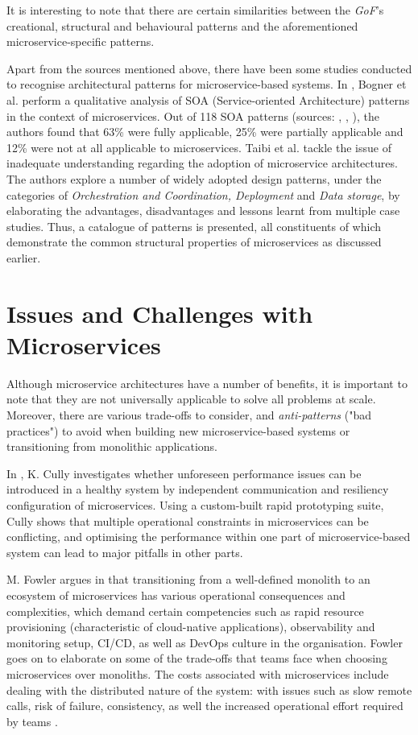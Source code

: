 It is interesting to note that there are certain similarities between the \textit{GoF}'s creational, structural and behavioural patterns \cite{gof94} and the aforementioned microservice-specific patterns. \linebreak

Apart from the sources mentioned above, there have been some studies conducted to recognise architectural patterns for microservice-based systems. In \cite{bogner18}, Bogner et al. perform a qualitative analysis of SOA (Service-oriented Architecture) patterns in the context of microservices. Out of 118 SOA patterns (sources: \cite{erl09}, \cite{erl12}, \cite{rotem12}), the authors found that 63\% were fully applicable, 25\% were partially applicable and 12\% were not at all applicable to microservices. Taibi et al. \cite{taibi18} tackle the issue of inadequate understanding regarding the adoption of microservice architectures. The authors explore a number of widely adopted design patterns, under the categories of \textit{Orchestration and Coordination, Deployment} and \textit{Data storage}, by elaborating the advantages, disadvantages and lessons learnt from multiple case studies. Thus, a catalogue of patterns is presented, all constituents of which demonstrate the common structural properties of microservices as discussed earlier.

\section{Issues and Challenges with Microservices}

Although microservice architectures have a number of benefits, it is important to note that they are not universally applicable to solve all problems at scale. Moreover, there are various trade-offs to consider, and \textit{anti-patterns} ("bad practices") to avoid when building new microservice-based systems or transitioning from monolithic applications.

In \cite{cully20}, K. Cully investigates whether unforeseen performance issues can be introduced in a healthy system by independent communication and resiliency configuration of microservices. Using a custom-built rapid prototyping suite, Cully shows that multiple operational constraints in microservices can be conflicting, and optimising the performance within one part of microservice-based system can lead to major pitfalls in other parts.

M. Fowler argues in \cite{fowler14} that transitioning from a well-defined monolith to an ecosystem of microservices has various operational consequences and complexities, which demand certain competencies such as rapid resource provisioning (characteristic of cloud-native applications), observability and monitoring setup, CI/CD, as well as DevOps culture in the organisation. Fowler goes on to elaborate on some of the trade-offs that teams face when choosing microservices over monoliths. The costs associated with microservices include dealing with the distributed nature of the system: with issues such as slow remote calls, risk of failure, consistency, as well the increased operational effort required by teams \cite{fowler15}.

